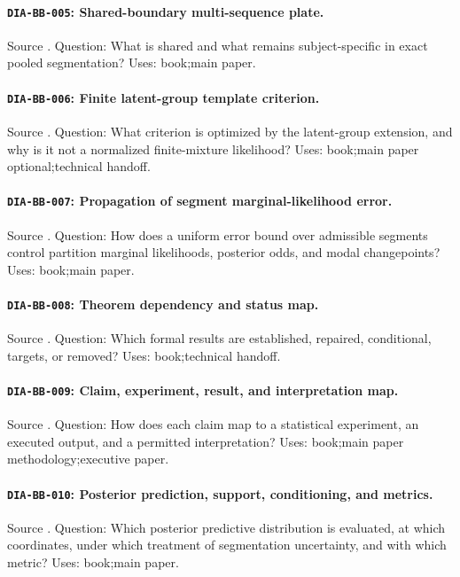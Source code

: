 \paragraph{\texttt{DIA-BB-005}: Shared-boundary multi-sequence plate.} Source . Question: What is shared and what remains subject-specific in exact pooled segmentation? Uses: book;main paper.
\paragraph{\texttt{DIA-BB-006}: Finite latent-group template criterion.} Source . Question: What criterion is optimized by the latent-group extension, and why is it not a normalized finite-mixture likelihood? Uses: book;main paper optional;technical handoff.
\paragraph{\texttt{DIA-BB-007}: Propagation of segment marginal-likelihood error.} Source . Question: How does a uniform error bound over admissible segments control partition marginal likelihoods, posterior odds, and modal changepoints? Uses: book;main paper.
\paragraph{\texttt{DIA-BB-008}: Theorem dependency and status map.} Source . Question: Which formal results are established, repaired, conditional, targets, or removed? Uses: book;technical handoff.
\paragraph{\texttt{DIA-BB-009}: Claim, experiment, result, and interpretation map.} Source . Question: How does each claim map to a statistical experiment, an executed output, and a permitted interpretation? Uses: book;main paper methodology;executive paper.
\paragraph{\texttt{DIA-BB-010}: Posterior prediction, support, conditioning, and metrics.} Source . Question: Which posterior predictive distribution is evaluated, at which coordinates, under which treatment of segmentation uncertainty, and with which metric? Uses: book;main paper.

